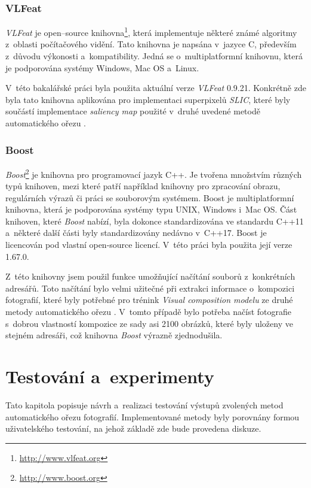 \subsection{VLFeat}
\emph{VLFeat} je open--source knihovna\footnote{\url{http://www.vlfeat.org}}, která implementuje některé známé algoritmy z~oblasti počítačového vidění. Tato knihovna je napsána v~jazyce C, především z~důvodu výkonosti a~kompatibility. Jedná se o~multiplatformní knihovnu, která je podporována systémy Windows, Mac OS a~Linux. 

V~této bakalářské práci byla použita aktuální verze \emph{VLFeat} 0.9.21. Konkrétně zde byla tato knihovna aplikována pro implementaci superpixelů \emph{SLIC}, které byly součástí implementace \emph{saliency map} \cite{Margolin2013} použité v~druhé uvedené metodě automatického ořezu \cite{Fang2014}.

\subsection{Boost}
\emph{Boost}\footnote{\url{http://www.boost.org}} je knihovna pro programovací jazyk C++. Je tvořena množstvím různých typů knihoven, mezi které patří například knihovny pro zpracování obrazu, regulárních výrazů či práci se souborovým systémem. Boost je multiplatformní knihovna, která je podporována systémy typu UNIX, Windows i~Mac OS. Část knihoven, které \emph{Boost} nabízí, byla dokonce standardizována ve standardu C++11 a~některé další části byly standardizovány nedávno v~C++17. Boost je licencován pod vlastní open-source licencí. V~této práci byla použita její verze 1.67.0. 

Z~této knihovny jsem použil funkce umožňující načítání souborů z~konkrétních adresářů. Toto načítání bylo velmi užitečné při extrakci informace o~kompozici fotografií, které byly potřebné pro trénink \emph{Visual composition modelu} ze druhé metody automatického ořezu \cite{Fang2014}. V~tomto případě bylo potřeba načíst fotografie s~dobrou vlastností kompozice ze sady asi 2100 obrázků, které byly uloženy ve stejném adresáři, což knihovna \emph{Boost} výrazně zjednodušila.

\chapter{Testování a~experimenty}
Tato kapitola popisuje návrh a~realizaci testování výstupů zvolených metod automatického ořezu fotografií. Implementované metody byly porovnány formou uživatelského testování, na jehož základě zde bude provedena diskuze.

